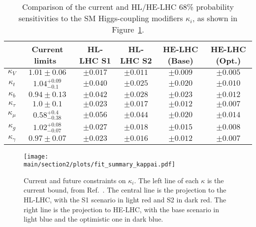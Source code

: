 \begin{table}[ht!]
\begin{center}
\caption{Comparison of the current and HL/HE-LHC 68\% probability sensitivities to the SM Higgs-coupling modifiers $\kappa_{i}$, as shown in Figure~\ref{fig:projection.kappai}.}\label{tab:projection.kappai}
\begin{tabular}{ c c c c c c }
  \hline\hline
  & Current limits~\cite{deBlas:2018tjm}  & HL-LHC S1 & HL-LHC S2 & HE-LHC (Base)&HE-LHC (Opt.) \\
  \hline
   $\kappa_{V}$&$1.01\pm0.06$ &$\pm 0.017$&$\pm 0.011$&$\pm 0.009$&$\pm 0.005$\\
  $\kappa_{t}$&$1.04^{+0.09}_{-0.1}$&$\pm 0.040$&$\pm 0.025$&$\pm 0.020$&$\pm 0.010$\\
  $\kappa_{b}$&$0.94\pm 0.13$ &$\pm 0.042$&$\pm 0.028$&$\pm 0.023$&$\pm 0.012$ \\
  $\kappa_{\tau}$&$1.0\pm 0.1$ &$\pm 0.023$&$\pm 0.017$& $\pm 0.012$&$\pm 0.007$\\
  $\kappa_{\mu}$&$0.58^{+0.4}_{-0.38} $ &$\pm 0.056$&$\pm 0.044$& $\pm 0.020$&$\pm 0.014$\\
  $\kappa_{g}$&$1.02^{+0.08}_{-0.07} $ &$\pm 0.027$&$\pm 0.018$& $\pm 0.015$&$\pm 0.008$\\
  $\kappa_{\gamma}$ &$0.97\pm 0.07 $&$\pm 0.023$&$\pm 0.016$&$\pm 0.012$&$\pm 0.007$\\
\hline\hline
\end{tabular}
\end{center}
\end{table}
%
\begin{figure}[ht]
\texttt{[image: \\main/section2/plots/fit\_summary\_kappai.pdf]}
\caption{Current and future constraints on $\kappa_{i}$. The left line of each $\kappa$ is the current bound, from Ref.~\cite{deBlas:2018tjm}. The central line is the projection to the HL-LHC, with the S1 scenario in light red and S2 in dark red. The right line is the projection to HE-LHC, with the base scenario in light blue and the optimistic one in dark blue.}\label{fig:projection.kappai}
\end{figure}
